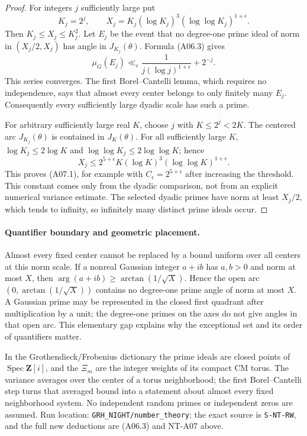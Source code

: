 \begin{proof}
For integers \(j\) sufficiently large put
\[
 K_j=2^j,\qquad
 X_j=K_j(\log K_j)^3(\log\log K_j)^{1+\epsilon}.
\]
Then \(K_j\le X_j\le K_j^2\). Let \(E_j\) be the event that
no degree-one prime ideal of norm in \((X_j/2,X_j)\) has angle
in \(J_{K_j}(\theta)\). Formula (A06.3) gives
\[
 \mu_G(E_j)\ll_\epsilon
      \frac1{j(\log j)^{1+\epsilon}}+2^{-j}.
\]
This series converges. The first Borel--Cantelli lemma, which
requires no independence, says that almost every center belongs
to only finitely many \(E_j\). Consequently every sufficiently
large dyadic scale has such a prime.

For arbitrary sufficiently large real \(K\), choose \(j\) with
\(K\le 2^j<2K\). The centered arc \(J_{K_j}(\theta)\) is contained
in \(J_K(\theta)\). For all sufficiently large \(K\),
\(\log K_j\le2\log K\) and
\(\log\log K_j\le2\log\log K\); hence
\[
 X_j\le 2^{5+\epsilon}
           K(\log K)^3(\log\log K)^{1+\epsilon}.
\]
This proves (A07.1), for example with \(C_\epsilon=2^{5+\epsilon}\)
after increasing the threshold. This constant comes only from
the dyadic comparison, not from an explicit numerical variance
estimate. The selected dyadic primes have norm at least \(X_j/2\),
which tends to infinity, so infinitely many distinct prime ideals
occur.
\end{proof}

\paragraph{Quantifier boundary and geometric placement.}
Almost every fixed center cannot be replaced by a bound uniform
over all centers at this norm scale. If a nonreal Gaussian
integer \(a+ib\) has \(a,b>0\) and norm at most \(X\), then
\(\arg(a+ib)\ge\arctan(1/\sqrt X)\). Hence the open arc
\((0,\arctan(1/\sqrt X))\) contains no degree-one prime angle
of norm at most \(X\). A Gaussian prime may be represented in
the closed first quadrant after multiplication by a unit;
the degree-one primes on the axes do not give angles in that
open arc. This elementary gap explains why the exceptional set
and its order of quantifiers matter.

In the Grothendieck/Frobenius dictionary the prime ideals are
closed points of \(\operatorname{Spec}\mathbf Z[i]\), and the
\(\Xi_m\) are the integer weights of its compact CM torus.
The variance averages over the center of a torus neighborhood;
the first Borel--Cantelli step turns that averaged bound into
a statement about almost every fixed neighborhood system.
No independent random primes or independent zeros are assumed.
Run location: \texttt{GRH\_NIGHT/number\_theory};
the exact source is \texttt{S-NT-RW}, and the full new deductions
are (A06.3) and NT-A07 above.
